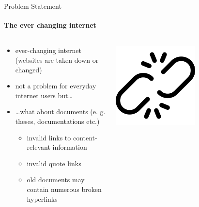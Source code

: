 \documentclass[
    ngerman,%
    authorontitle=true,
]{bfhbeamer}
\begin{document}
    \begin{frame}{Problem Statement}
        \framesubtitle{The ever changing internet}
        \begin{columns} %
            \begin{column}{0.6\textwidth} %
                \begin{itemize}
                    \item ever-changing internet (websites are taken down or changed)
                    \item not a problem for everyday internet users but\ldots
                    \item \ldots what about documents (e. g. theses, documentations etc.)
                    \begin{itemize}
                        \item invalid links to content-relevant information
                        \item invalid quote links
                        \item old documents may contain numerous broken hyperlinks
                    \end{itemize}
                \end{itemize}
            \end{column}
            \begin{column}{0.3\textwidth} %
                \includegraphics[width=0.6\textwidth]{pictures/broken_link}
            \end{column}
        \end{columns}
    \end{frame}
\end{document}
